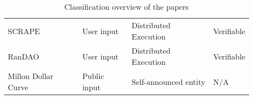 \begin{table}[htbp]
\begin{tabularx}{\textwidth}{Xlll}
SCRAPE                           & User input                    & Distributed Execution                  & Verifiable                  \\ [1.5em]
RanDAO                           & User input                    & Distributed Execution                  & Verifiable                  \\ [1.5em]
Millon Dollar Curve              & Public input                  & Self-announced entity                  & N/A                         \\ \bottomrule
    \end{tabularx}
    \caption{Classification overview of the papers}\label{tab:paper_overview}
\end{table}

